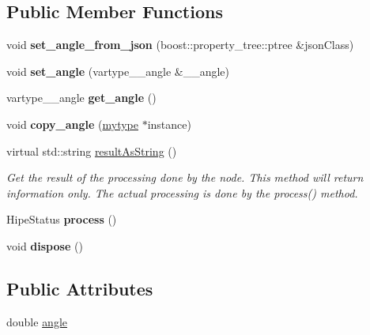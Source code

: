 \subsection*{Public Member Functions}
\begin{DoxyCompactItemize}
\item 
\mbox{\label{classfilter_1_1algos_1_1_rotate_image_a27af06c91ef34b24404f5cb50db53566}} 
void {\bfseries set\+\_\+angle\+\_\+from\+\_\+json} (boost\+::property\+\_\+tree\+::ptree \&json\+Class)
\item 
\mbox{\label{classfilter_1_1algos_1_1_rotate_image_a256dc76fb763625cd2c00bd871454fe0}} 
void {\bfseries set\+\_\+angle} (vartype\+\_\+\+\_\+angle \&\+\_\+\+\_\+angle)
\item 
\mbox{\label{classfilter_1_1algos_1_1_rotate_image_a473f030697ddb109556ecf12580861ba}} 
vartype\+\_\+\+\_\+angle {\bfseries get\+\_\+angle} ()
\item 
\mbox{\label{classfilter_1_1algos_1_1_rotate_image_ad9dfd5f332ef0dd24be69c129606b8b7}} 
void {\bfseries copy\+\_\+angle} (\hyperlink{classfilter_1_1algos_1_1_rotate_image}{mytype} $\ast$instance)
\item 
virtual std\+::string \hyperlink{classfilter_1_1algos_1_1_rotate_image_af9aeff9c2232e6fc97708cbc41ee1fb2}{result\+As\+String} ()
\begin{DoxyCompactList}\small\item\em Get the result of the processing done by the node. This method will return information only. The actual processing is done by the process() method. \end{DoxyCompactList}\item 
\mbox{\label{classfilter_1_1algos_1_1_rotate_image_a048ccb515c462c2b4e3bad7fbdcc621e}} 
Hipe\+Status {\bfseries process} ()
\item 
\mbox{\label{classfilter_1_1algos_1_1_rotate_image_a2c211d5f16a4cda069cab4e8ee80c0e4}} 
void {\bfseries dispose} ()
\end{DoxyCompactItemize}
\subsection*{Public Attributes}
\begin{DoxyCompactItemize}
\item 
double \hyperlink{classfilter_1_1algos_1_1_rotate_image_ae815c8d88eae42fcf231b6d5540ecbf3}{angle}
\end{DoxyCompactItemize}
